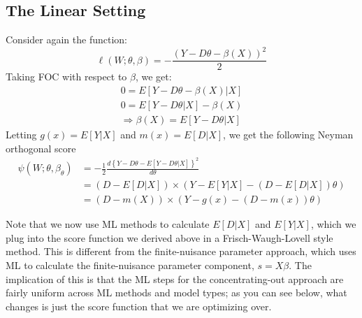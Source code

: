 \documentclass[11pt]{article}
\begin{document}
\subsection{The Linear Setting}
Consider again the function:
$$\ell(W ; \theta, \beta)=-\frac{(Y-D \theta-\beta(X))^{2}}{2}$$
Taking FOC with respect to $\beta$, we get:
\begin{align*}
	0 = E[Y - D\theta - \beta(X)| X] \\
  0 = E[Y- D\theta|X] - \beta(X) \\
	\Rightarrow \beta(X) = E[Y - D\theta |X]
\end{align*}
Letting $g(x) = E[Y|X]$ and $m(x) = E[D|X]$, we get the following Neyman orthogonal score
\begin{align*}
	\psi\left(W ; \theta, \beta_{\theta}\right) &=-\frac{1}{2} \frac{d\left\{Y-D \theta-E[Y-D \theta | X]\right\}^{2}}{d \theta} \\
	&=\left(D-E[D | X]\right) \times\left(Y-E[Y | X]-\left(D-E[D | X]\right) \theta\right) \\
	&=\left(D-m(X)\right) \times\left(Y- g(x) - (D - m(x) )\theta\right)
\end{align*}

Note that we now use ML methods to calculate $E[D|X]$ and $E[Y|X]$, which we plug into the score function we derived above in a Frisch-Waugh-Lovell style method. This is different from the finite-nuisance parameter approach, which uses ML to calculate the finite-nuisance parameter component, $s = X\beta$. The implication of this is that the ML steps for the concentrating-out approach are fairly uniform across ML methods and model types; as you can see below, what changes is just the score function that we are optimizing over.
\end{document}
